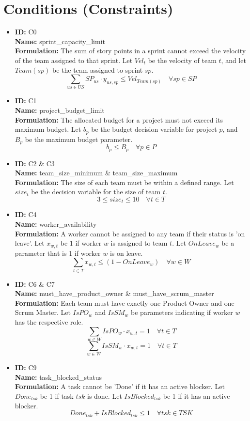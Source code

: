 \documentclass[11pt]{article}
\begin{document}
\section{Conditions (Constraints)}
\begin{itemize}
    \item \textbf{ID:} C0 \\ \textbf{Name:} sprint\_capacity\_limit \\
    \textbf{Formulation:} The sum of story points in a sprint cannot exceed the velocity of the team assigned to that sprint. Let $Vel_t$ be the velocity of team $t$, and let $Team(sp)$ be the team assigned to sprint $sp$.
    $$ \sum_{us \in US} SP_{us} \cdot y_{us,sp} \leq Vel_{Team(sp)} \quad \forall sp \in SP $$

    \item \textbf{ID:} C1 \\ \textbf{Name:} project\_budget\_limit \\
    \textbf{Formulation:} The allocated budget for a project must not exceed its maximum budget. Let $b_p$ be the budget decision variable for project $p$, and $B_p$ be the maximum budget parameter.
    $$ b_p \leq B_p \quad \forall p \in P $$

    \item \textbf{ID:} C2 \& C3 \\ \textbf{Name:} team\_size\_minimum \& team\_size\_maximum \\
    \textbf{Formulation:} The size of each team must be within a defined range. Let $size_t$ be the decision variable for the size of team $t$.
    $$ 3 \leq size_t \leq 10 \quad \forall t \in T $$

    \item \textbf{ID:} C4 \\ \textbf{Name:} worker\_availability \\
    \textbf{Formulation:} A worker cannot be assigned to any team if their status is 'on leave'. Let $x_{w,t}$ be 1 if worker $w$ is assigned to team $t$. Let $OnLeave_w$ be a parameter that is 1 if worker $w$ is on leave.
    $$ \sum_{t \in T} x_{w,t} \leq (1 - OnLeave_w) \quad \forall w \in W $$

    \item \textbf{ID:} C6 \& C7 \\ \textbf{Name:} must\_have\_product\_owner \& must\_have\_scrum\_master \\
    \textbf{Formulation:} Each team must have exactly one Product Owner and one Scrum Master. Let $IsPO_w$ and $IsSM_w$ be parameters indicating if worker $w$ has the respective role.
    $$ \sum_{w \in W} IsPO_w \cdot x_{w,t} = 1 \quad \forall t \in T $$
    $$ \sum_{w \in W} IsSM_w \cdot x_{w,t} = 1 \quad \forall t \in T $$
    
    \item \textbf{ID:} C9 \\ \textbf{Name:} task\_blocked\_status \\
    \textbf{Formulation:} A task cannot be 'Done' if it has an active blocker. Let $Done_{tsk}$ be 1 if task $tsk$ is done. Let $IsBlocked_{tsk}$ be 1 if it has an active blocker.
    $$ Done_{tsk} + IsBlocked_{tsk} \leq 1 \quad \forall tsk \in TSK $$
\end{itemize}
\end{document}
